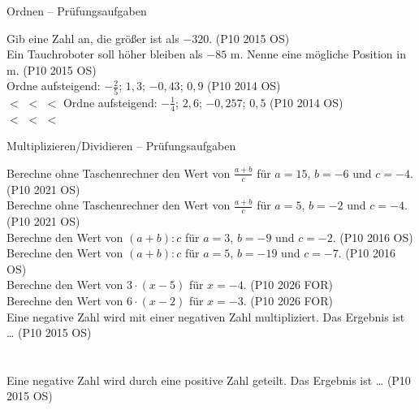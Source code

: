 \setcounter{aufgabe}{15}

\begin{aufgabe}{Ordnen – Prüfungsaufgaben}
\begin{teile}
\teil Gib eine Zahl an, die größer ist als $-320$. \hfill (P10 2015 OS) \\ \leerfeld
\teil Ein Tauchroboter soll höher bleiben als $-85$ m. Nenne eine mögliche Position in m. \hfill (P10 2015 OS) \\ \leerfeld[m]
\teil Ordne aufsteigend: $-\frac{2}{5}$; $1{,}3$; $-0{,}43$; $0{,}9$ \hfill (P10 2014 OS) \\ \leerfeld $<$ \leerfeld $<$ \leerfeld $<$ \leerfeld
\teil Ordne aufsteigend: $-\frac{1}{4}$; $2{,}6$; $-0{,}257$; $0{,}5$ \hfill (P10 2014 OS) \\ \leerfeld $<$ \leerfeld $<$ \leerfeld $<$ \leerfeld
\end{teile}
\end{aufgabe}

\begin{aufgabe}{Multiplizieren/Dividieren – Prüfungsaufgaben}
\begin{teile}
\teil Berechne ohne Taschenrechner den Wert von $\frac{a + b}{c}$ für $a = 15$, $b = -6$ und $c = -4$. \hfill (P10 2021 OS) \\ \leerfeld
\teil Berechne ohne Taschenrechner den Wert von $\frac{a + b}{c}$ für $a = 5$, $b = -2$ und $c = -4$. \hfill (P10 2021 OS) \\ \leerfeld
\teil Berechne den Wert von $(a + b) : c$ für $a = 3$, $b = -9$ und $c = -2$. \hfill (P10 2016 OS) \\ \leerfeld
\teil Berechne den Wert von $(a + b) : c$ für $a = 5$, $b = -19$ und $c = -7$. \hfill (P10 2016 OS) \\ \leerfeld
\teil Berechne den Wert von $3 \cdot (x - 5)$ für $x = -4$. \hfill (P10 2026 FOR) \\ \leerfeld
\teil Berechne den Wert von $6 \cdot (x - 2)$ für $x = -3$. \hfill (P10 2026 FOR) \\ \leerfeld
\teil Eine negative Zahl wird mit einer negativen Zahl multipliziert. Das Ergebnis ist … \hfill (P10 2015 OS)\\ \\ \\ 
\teil Eine negative Zahl wird durch eine positive Zahl geteilt. Das Ergebnis ist … \hfill (P10 2015 OS)\\ \\ \\ 
\end{teile}
\end{aufgabe}
